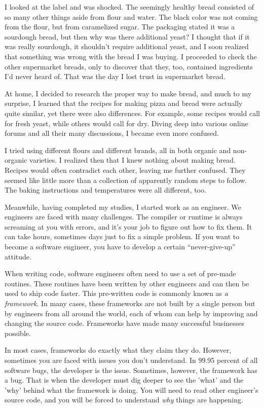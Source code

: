 I looked at the label and was shocked. The seemingly
healthy bread consisted of so many other things aside from flour and water.
The black color was not coming from the flour, but from caramelized sugar.
The packaging stated it was a sourdough bread, but then why was there additional yeast?
I thought that if it was really sourdough, it shouldn't require additional yeast, and I
soon realized that something was wrong with the bread I was buying.
I proceeded to check the other supermarket breads, only to discover that they, too,
contained ingredients I'd never heard of. That was the day I lost trust
in supermarket bread.

At home, I decided to research the proper way to make bread, and much to my surprise,
I learned that the recipes for making pizza and bread were actually quite similar, yet
there were also differences. For example, some recipes would call for fresh yeast, while
others would call for dry. Diving deep into various online forums and all their many
discussions, I became even more confused.

I tried using different flours and different brands, all in both organic and non-organic varieties.
I realized then that I knew nothing about making bread. Recipes would often contradict each other,
leaving me further confused. They seemed like little more than a collection of apparently random
steps to follow. The baking instructions and temperatures were all different, too.

Meanwhile, having completed my studies, I started work as an engineer.
We engineers are faced with many challenges. The compiler or runtime is
always screaming at you with errors, and it's your job to figure out how to fix them.
It can take hours, sometimes days just to fix a simple problem. If you want
to become a software engineer, you have to develop a certain ``never-give-up'' attitude.

When writing code, software engineers often need to use a set of pre-made routines. These routines have been
written by other engineers and can then be used to ship code faster.
This pre-written code is commonly known as {\it a framework}. In many cases,
these frameworks are not built by a single person but by engineers from all around the world,
each of whom can help by improving and changing the source code. Frameworks have made many successful
businesses possible.

In most cases, frameworks do exactly what they claim they do. However,
sometimes you are faced with issues you don't understand. In 99.95 percent
of all software bugs, the developer is the issue. Sometimes, however, the framework has a
bug. That is when the developer must dig deeper to see the 'what' and the 'why' behind what
the framework is doing. You will need to read other engineer's source code, and you will be forced
to understand {\it why} things are happening.

